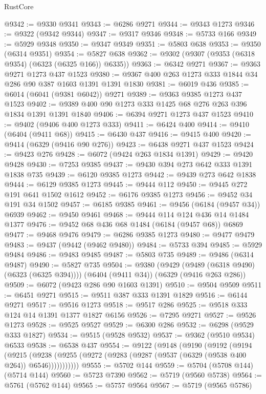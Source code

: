 \begin{lexlean}{RustCore}
\begin{coremodule}
@9342 := @9330 @9341
@9343 := @6286 @9271
@9344 := @9343 @1273
@9346 := @9322 (@9342 @9344)
@9347 := @9317 @9346
@9348 := @5733 @166
@9349 := @5929 @9348
@9350 := @9347 @9349
@9351 := @5803 @638
@9353 := @9350 (@6314 @9351)
@9354 := @5827 @638
@9362 := @9302 (@9307 (@9353 (@6318 @9354) (@6323 (@6325 @166)) @6335))
@9363 := @6342 @9271
@9367 := @9363 @9271 @1273 @437 @1523
@9380 := @9367 @400 @263 @1273 @333 @1844 @34 @286 @90 @387 @1603 @1391 @1391 @1830
@9381 := @6019 @436
@9385 := @6014 (@6041 (@9381 @6042)) @9271
@9389 := @9363 @9385 @1273 @437 @1523
@9402 := @9389 @400 @90 @1273 @333 @1425 @68 @276 @263 @396 @1834 @1391 @1391 @1840
@9406 := @6394 @9271 @1273 @437 @1523
@9410 := @9402 (@9406 @400 @1273 @333)
@9411 := @6424 @400
@9414 := @9410 (@6404 (@9411 @68))
@9415 := @6430 @437
@9416 := @9415 @400
@9420 := @9414 (@6329 (@9416 @90 @276))
@9423 := @6438 @9271 @437 @1523
@9424 := @9423 @276
@9428 := @6072 (@9424 @263 @1834 @1391)
@9429 := @9420 @9428
@9430 := @7253 @9385
@9437 := @9430 @394 @273 @642 @333 @1391 @1838 @735
@9439 := @6120 @9385 @1273
@9442 := @9439 @273 @642 @1838
@9444 := @6129 @9385 @1273
@9445 := @9444 @112
@9450 := @9445 @272 @191 @641 @1502 @1612
@9452 := @6176 @9385 @1273
@9456 := @9452 @34 @191 @34 @1502
@9457 := @6185 @9385
@9461 := @9456 (@6184 (@9457 @34)) @6939
@9462 := @9450 @9461
@9468 := @9444 @114 @124 @436 @14 @1484 @1377
@9476 := @9452 @68 @436 @68 @1484 (@6184 (@9457 @68)) @6869
@9477 := @9468 @9476
@9479 := @6286 @9385 @1273
@9480 := @9477 @9479
@9483 := @9437 (@9442 (@9462 @9480))
@9484 := @5733 @394
@9485 := @5929 @9484
@9486 := @9483 @9485
@9487 := @5803 @735
@9489 := @9486 (@6314 @9487)
@9490 := @5827 @735
@9504 := @9380
    (@9429 (@9489 (@6318 @9490) (@6323 (@6325 @394))))
    (@6404 (@9411 @34))
    (@6329 (@9416 @263 @286))
@9509 := @6072 (@9423 @286 @90 @1603 @1391)
@9510 := @9504 @9509
@9511 := @6451 @9271
@9515 := @9511 @387 @333 @1391 @1829
@9516 := @6144 @9271
@9517 := @9516 @1273
@9518 := @9517 @286
@9525 := @9518 @333 @124 @14 @1391 @1377 @1827 @6156
@9526 := @7295 @9271
@9527 := @9526 @1273
@9528 := @9525 @9527
@9529 := @6300 @286
@9532 := @6298 (@9529 @333 @1827)
@9534 := @9515 (@9528 @9532)
@9537 := @9362 (@9510 @9534) @6533
@9538 := @6538 @437
@9554 := @9122
    (@9148
      (@9190
        (@9192
          (@9194
            (@9215
              (@9238 (@9255 (@9272 (@9283 (@9287 (@9537 (@6329 (@9538 @400 @264)) @6546)))))))))))
@9555 := @5702 @144
@9559 := @5704 (@5708 @144) (@5714 @144)
@9560 := @5723 @7390
@9562 := @5719 (@9560 @5738)
@9564 := @5761 (@5762 @144)
@9565 := @5757 @9564
@9567 := @5719 (@9565 @5786)

\end{coremodule}
\end{lexlean}
